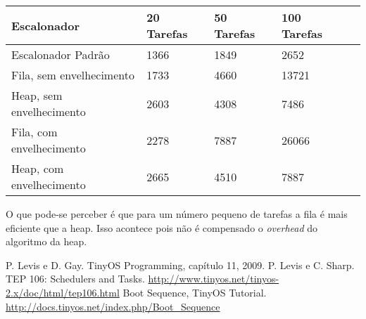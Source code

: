 \documentclass[a4paper,onecolumn, 10pt]{article}
\begin{document}
\begin{center}
    \begin{tabular}{ | l | l | l | l | p{5cm} |}
    \hline
    Escalonador              & 20 Tarefas & 50 Tarefas & 100 Tarefas \\ \hline
    Escalonador Padrão       & 1366 & 1849 & 2652 \\ \hline 
    Fila, sem envelhecimento & 1733 & 4660 & 13721 \\ \hline 
    Heap, sem envelhecimento & 2603 & 4308 & 7486 \\ \hline
    Fila, com envelhecimento & 2278 & 7887 & 26066 \\ \hline
    Heap, com envelhecimento & 2665 & 4510 & 7887 \\ \hline
    \end{tabular}
\end{center}
O que pode-se perceber é que para um número pequeno de tarefas a fila é mais eficiente que a heap. Isso acontece pois
não é compensado o \textit{overhead} do algoritmo da heap.
\pagebreak

\begin{thebibliography}{9}
 P. Levis e D. Gay. TinyOS Programming, capítulo 11, 2009.
 P. Levis e C. Sharp. TEP 106: Schedulers and Tasks.
                    \url{http://www.tinyos.net/tinyos-2.x/doc/html/tep106.html}
 Boot Sequence, TinyOS Tutorial. \url{http://docs.tinyos.net/index.php/Boot_Sequence}
\end{thebibliography}
\end{document}
